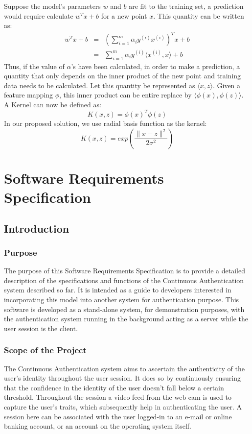 \documentclass[12pt]{report}			%
\begin{document}
Suppose the model's parameters $w$ and $b$ are fit to the training set, a prediction would require calculate $w^Tx+b$ for a new point $x$. 
This quantity can be written as:
\begin{eqnarray}
w^Tx + b & = & \left( \sum_{i=1}^{m}\alpha_{i} y^{(i)} x^{(i)} \right)^Tx + b \\
         & = & \sum_{i=1}^{m} \alpha_{i}y^{(i)}\langle x^{(i)},x\rangle + b
\end{eqnarray}
Thus, if the value of $\alpha$'s have been calculated, in order to make a prediction, a quantity that only depends on the inner product of the new point and training data needs to be calculated.
Let this quantity be represented as $\langle x, z\rangle$.
Given a feature mapping $\phi$, this inner product can be entire replace by $\langle \phi(x),\phi(z) \rangle$.
A Kernel can now be defined as:
\begin{equation}
K(x,z) = \phi(x)^T\phi(z)
\end{equation}
In our proposed solution, we use radial basis function as the kernel:
\begin{equation}
K(x,z) = exp\left( \frac {\parallel x - z \parallel ^2} {2\sigma^2} \right)
\end{equation}


\newpage
\chapter{Software Requirements Specification }
\section{ Introduction }

\subsection{ Purpose }
The purpose of this Software Requirements Specification is to provide a detailed description of the specifications and functions of the Continuous Authentication system described so far. It is intended as a guide to developers interested in incorporating this model into another system for authentication purpose. This software is developed as a stand-alone system, for demonstration purposes, with the authentication system running in the background acting as a server while the user session is the client. 

\subsection{ Scope of the Project }
The Continuous Authentication system aims to ascertain the authenticity of the user's identity throughout the user session. It does so by continuously ensuring that the confidence in the identity of the user doesn't fall below a certain threshold. Throughout the session a video-feed from the web-cam is used to capture the user's traits, which subsequently help in authenticating the user. A session here can be associated with the user logged-in to an e-mail or online banking account, or an account on the operating system itself.
\end{document}
